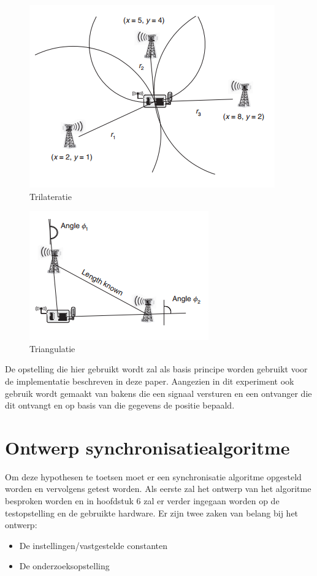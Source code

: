 \documentclass{article}
\begin{document}
\begin{figure}[h]
\centering\includegraphics[scale=0.75]{trilateratie.png}
\caption{Trilateratie \cite{h9}}
\label{trilateratie}
\end{figure}
\begin{figure}[h]
\centering\includegraphics[scale=0.75]{triangulatie.png}
\caption{Triangulatie \cite{h9}}
\label{triangulatie}
\end{figure}

De opstelling die hier gebruikt wordt zal als basis principe worden gebruikt voor de implementatie beschreven in deze paper. Aangezien in dit experiment ook gebruik wordt gemaakt van bakens die een signaal versturen en een ontvanger die dit ontvangt en op basis van die gegevens de positie bepaald. 

\section{Ontwerp synchronisatiealgoritme}
Om deze hypothesen te toetsen moet er een synchronisatie algoritme opgesteld worden en vervolgens getest worden. Als eerste zal het ontwerp van het algoritme besproken worden en in hoofdstuk 6 zal er verder ingegaan worden op de testopstelling en de gebruikte hardware. Er zijn twee zaken van belang bij het ontwerp: 
\begin{itemize}
	\item De instellingen/vastgestelde constanten
	\item De onderzoeksopstelling
\end{itemize}
\end{document}
